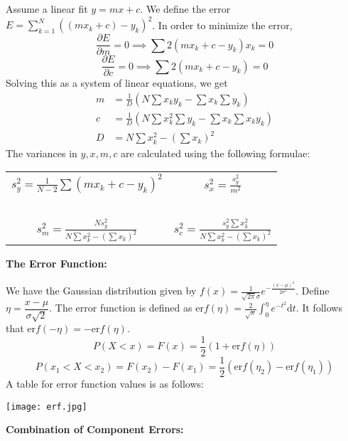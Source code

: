 \documentclass[11pt]{article}
\theoremstyle{definition}
\begin{document}
Assume a linear fit $y=mx+c$. We define the error $\displaystyle E=\sum_{k=1}^N\left((mx_k+c)-y_k\right)^2$. In order to minimize the error,
$$\frac{\partial E}{\partial m}=0\implies \sum 2(mx_k+c-y_k)x_k=0$$
$$\frac{\partial E}{\partial c}=0\implies \sum 2(mx_k+c-y_k)=0$$
Solving this as a system of linear equations, we get
\begin{align*}
m&=\frac{1}{D}\left(N\sum x_ky_k-\sum x_k\sum y_k\right)\\
c&=\frac{1}{D}\left(N\sum x_k^2\sum y_k-\sum x_k\sum x_ky_k\right)\\
D&=N\sum x_k^2-\left(\sum x_k\right)^2
\end{align*}
The variances in $y,x,m,c$ are calculated using the following formulae:
\vspace{-3.5mm}
\begin{center}
\begin{tabular}{cc}
	$\displaystyle s_y^2=\frac{1}{N-2}\sum \left(mx_k+c-y_k\right)^2$ & $\displaystyle s_x^2=\frac{s_y^2}{m^2}$\\~\\ 
	\vspace{-3.5mm}
	$\displaystyle s_m^2=\frac{Ns_y^2}{N\sum x_k^2-\left(\sum x_k\right)^2}$ & $\displaystyle s_c^2=\frac{s_y^2\sum x_k^2}{N\sum x_k^2-\left(\sum x_k\right)^2}$\\
\end{tabular}
\end{center}
\textbf{\large The Error Function:}

We have the Gaussian distribution given by $\displaystyle f(x)=\frac{1}{\sqrt{2\pi}\sigma}e^{-\frac{(x-\mu)^2}{2\sigma^2}}$. Define $\eta=\dfrac{x-\mu}{\sigma\sqrt{2}}$. The error function is defined as $\displaystyle\text{er}f(\eta)=\frac{2}{\sqrt{\pi}}\int_0^{\eta}e^{-t^2}\text{d}t$. It follows that $\text{er}f(-\eta)=-\text{er}f(\eta)$.
$$P(X<x)=F(x)=\frac{1}{2}(1+\text{er}f(\eta))$$
$$P(x_1<X<x_2)=F(x_2)-F(x_1)=\frac{1}{2}(\text{er}f(\eta_2)-\text{er}f(\eta_1))$$
\newpage
A table for error function values is as follows:
\vspace{-8mm}
\begin{center}
\texttt{[image: erf.jpg]}
\end{center}
\vspace{-3.5mm}

\textbf{\large Combination of Component Errors:}
\end{document}
